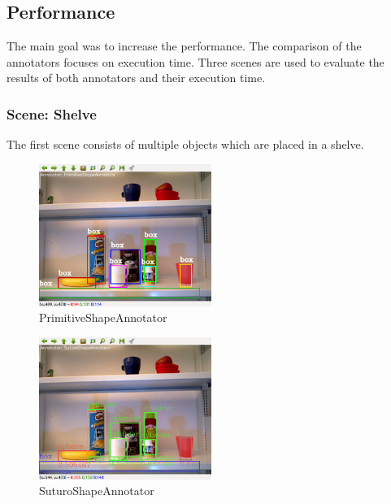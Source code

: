 \documentclass[main.tex]{subfiles}
\begin{document}
\subsection{Performance}
The main goal was to increase the performance. The comparison of the annotators focuses on execution time.
Three scenes are used to evaluate the results of both annotators and their execution time.

\subsubsection{Scene: Shelve}
The first scene consists of multiple objects which are placed in a shelve.
\begin{figure}
  \center
  \includegraphics[width=0.5\textwidth]{pictures/perception/shape_annotator/classification_test_shelve/primitive.png}
  \caption{PrimitiveShapeAnnotator}
  \label{fig:shapeAnnotatorShelvePrimitive}
\end{figure}
\begin{figure}
  \center
  \includegraphics[width=0.5\textwidth]{pictures/perception/shape_annotator/classification_test_shelve/suturo.png}
  \caption{SuturoShapeAnnotator}
  \label{fig:shapeAnnotatorShelveSuturo}
\end{figure}
\end{document}
